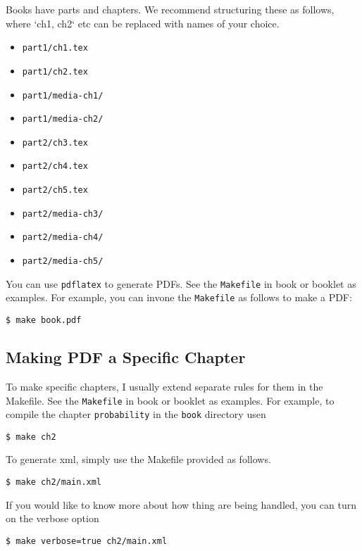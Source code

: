 \begin{gram}[Books]

Books have parts and chapters. We recommend structuring these as follows, where `ch1, ch2` etc can be replaced with names of your choice.
%
\begin{itemize}
\item \lstinline`part1/ch1.tex`
\item \lstinline`part1/ch2.tex`
\item \lstinline`part1/media-ch1/`
\item \lstinline`part1/media-ch2/`
\item \lstinline`part2/ch3.tex`
\item \lstinline`part2/ch4.tex`
\item \lstinline`part2/ch5.tex`
\item \lstinline`part2/media-ch3/`
\item \lstinline`part2/media-ch4/`
\item \lstinline`part2/media-ch5/`
\end{itemize}
   
\end{gram}


\begin{gram}
You can use \lstinline`pdflatex` to generate PDFs.  See the \lstinline`Makefile` in book or booklet as examples.
%
For example, you can  invone the \lstinline`Makefile` as follows to make a PDF:
\begin{lstlisting}
$ make book.pdf
\end{lstlisting}

\subsection{Making PDF a Specific Chapter}
To make specific chapters, I usually extend separate rules for them in the Makefile.  See the \lstinline`Makefile` in book or booklet as examples.
%
For example, to compile the chapter \lstinline`probability` in the \lstinline`book` directory usen
\begin{lstlisting}
$ make ch2
\end{lstlisting}
\end{gram}

\begin{gram}

To generate xml, simply use the Makefile provided as follows.
%
\begin{lstlisting}
$ make ch2/main.xml
\end{lstlisting}
%
If you would like to know more about how thing are being handled, you can turn on the verbose option
%
\begin{lstlisting}
$ make verbose=true ch2/main.xml
\end{lstlisting}
\end{gram}


